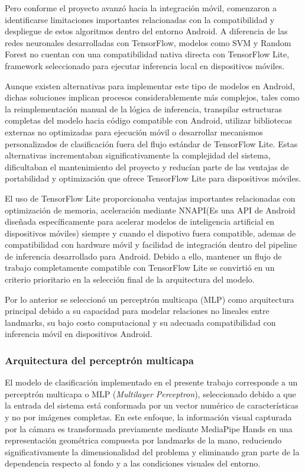 	Pero conforme el proyecto avanzó hacia la integración móvil, comenzaron a identificarse limitaciones importantes relacionadas con la compatibilidad y despliegue de estos algoritmos dentro del entorno Android. A diferencia de las redes neuronales desarrolladas con TensorFlow, modelos como SVM y Random Forest no cuentan con una compatibilidad nativa directa con TensorFlow Lite, framework seleccionado para ejecutar inferencia local en dispositivos móviles.
	
	Aunque existen alternativas para implementar este tipo de modelos en Android, dichas soluciones implican procesos considerablemente más complejos, tales como la reimplementación manual de la lógica de inferencia, transpilar estructuras completas del modelo hacia código compatible con Android, utilizar bibliotecas externas no optimizadas para ejecución móvil o desarrollar mecanismos personalizados de clasificación fuera del flujo estándar de TensorFlow Lite. Estas alternativas incrementaban significativamente la complejidad del sistema, dificultaban el mantenimiento del proyecto y reducían parte de las ventajas de portabilidad y optimización que ofrece TensorFlow Lite para dispositivos móviles.
	
	El uso de TensorFlow Lite proporcionaba ventajas importantes relacionadas con optimización de memoria, aceleración mediante NNAPI(Es una API de Android diseñada específicamente para acelerar modelos de inteligencia artificial en dispositivos móviles) siempre y cuando el dispotivo fuera compatible, ademas de  compatibilidad con hardware móvil y facilidad de integración dentro del pipeline de inferencia desarrollado para Android. Debido a ello, mantener un flujo de trabajo completamente compatible con TensorFlow Lite se convirtió en un criterio prioritario en la selección final de la arquitectura del modelo.
	
	Por lo anterior se seleccionó un perceptrón multicapa (MLP) como arquitectura principal debido a su capacidad para modelar relaciones no lineales entre landmarks, su bajo costo computacional y su adecuada compatibilidad con inferencia móvil en dispositivos Android.
	
	
	\subsubsection{Arquitectura del perceptrón multicapa}
	
	El modelo de clasificación implementado en el presente trabajo corresponde a un perceptrón multicapa o MLP (\textit{Multilayer Perceptron}), seleccionado debido a que la entrada del sistema está conformada por un vector numérico de características y no por imágenes completas. En este enfoque, la información visual capturada por la cámara es transformada previamente mediante MediaPipe Hands en una representación geométrica compuesta por landmarks de la mano, reduciendo significativamente la dimensionalidad del problema y eliminando gran parte de la dependencia respecto al fondo y a las condiciones visuales del entorno.
	
